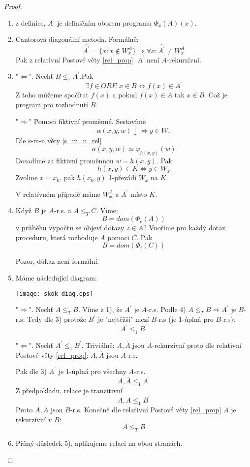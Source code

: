 \begin{proof}
	\begin{enumerate}
		\item z definice, $A^{\prime}$ je definičním oborem programu $\Phi_x(A)(x)$.
		\item Cantorová diagonální metoda. Formálně:
			\[ \overline{A^{\prime}} = \{ x : x \notin W_x^A \} \Rightarrow \forall x: \overline{A^{\prime}} \neq W_x^A \]
			Pak z relativní Postové věty \cref{rel_prop}: $A^{\prime}$ není $A$-rekurzívní.
		\item "$\Leftarrow$". Nechť $B \leq_1 A^{\prime}$.Pak
			\[ \exists f \in ORF: x \in B \iff f(x) \in A^{\prime} \]
			Z toho můžeme spočítat $f(x)$ a pokud $f(x) \in A$ tak $x \in B$.
			Což je program pro rozhodnutí $B$.

			"$\Rightarrow$" Pomoci fiktivní proměnné.
			Sestavíme
			\[ \alpha(x, y, w) \downarrow \iff y \in W_x \]
			Dle s-m-n věty \cref{s_m_n_rel}
			\[ \alpha(x, y, w) \simeq \varphi_{h(x, y)}(w) \]
			Dosadíme za fiktivní proměnnou $w = h(x, y)$.
			Pak
			\[ h(x, y) \in K \iff y \in W_x \]
			Zvolme $x = x_0$, pak $h(x_0, y)$ 1-převádí $W_x$ na $K$.

			V relatívném případě máme $W_x^A$ a $A^{\prime}$ místo $K$.
		\item Když $B$ je $A$-r.s. a $A \leq_T C$. Víme:
			\[ B = dom(\Phi_e(A)) \]
			v průběhu vypočtu se objeví dotazy $z \in A$?
			Vnoříme pro každý dotaz proceduru, která rozhoduje $A$ pomoci $C$.
			Pak
			\[ B = dom(\Phi_i(C)) \]

			Pozor, důkaz není formální.
		\item Máme následující diagram:

		\texttt{[image: skok\_diag.eps]}

		"$\Rightarrow$". Nechť $A \leq_T B$.
		Víme z 1), že $A^{\prime}$ je $A$-r.s.
		Podle 4) $A \leq_T B \Rightarrow A^{\prime}$ je $B$-r.s.
		Tedy dle 3) protože $B^{\prime}$ je "nejtěžší" mezí $B$-r.s (je 1-úplná pro $B$-r.s):
		\[ A^{\prime} \leq_1 B^{\prime} \]

		"$\Leftarrow$". Nechť $A^{\prime} \leq_1 B^{\prime}$.
		Triviálně: $A, \overline{A}$ jsou $A$-rekurzívní proto dle relativní Postové věty \cref{rel_prop}:
		$A, \overline{A}$ jsou $A$-r.s.

		Pak dle 3) $A^{\prime}$ je 1-úplná pro všechny $A$-r.s.
		\[ A, \overline{A} \leq_1 A^{\prime} \]
		Z předpokladu, relace je tranzitivní
		\[ A, \overline{A} \leq_1 B^{\prime} \]
		Proto $A, \overline{A}$ jsou $B$-r.s.
		Konečně dle relativní Postové věty \cref{rel_prop} $A$ je rekurzívní v $B$:
		\[ A \leq_T B \]

		\item Přímý důsledek 5), aplikujeme relaci na obou stranách.

	\end{enumerate}
\end{proof}

